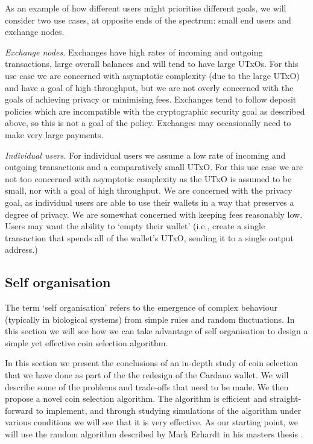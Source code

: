 \documentclass{article}
\theoremstyle{definition}{
  \newtheorem{lemma}{Lemma}[section] %
  \newtheorem{definition}[lemma]{Definition}
}
\theoremstyle{theorem}{
  \newtheorem{invariant}[lemma]{Invariant}
  \newtheorem{proofobligation}[lemma]{Proof Obligation}
}
\numberwithin{equation}{lemma}
\begin{document}
As an example of how different users might prioritise different goals,
we will consider two use cases, at opposite ends of the spectrum: small end
users and exchange nodes.

\emph{Exchange nodes.}
Exchanges have high rates of incoming and outgoing transactions, large overall
balances and will tend to have large UTxOs. For this use case we are concerned
with asymptotic complexity (due to the large UTxO) and have a goal of high
throughput, but we are not overly concerned with the goals of achieving privacy
or minimising fees. Exchanges tend to follow deposit policies which are
incompatible with the cryptographic security goal as described above, so this is
not a goal of the policy. Exchanges may occasionally need to make very large
payments.

\emph{Individual users.}
For individual users we assume a low rate of incoming and outgoing transactions
and a comparatively small UTxO. For this use case we are not too concerned with
asymptotic complexity as the UTxO is assumed to be small, nor with a goal of
high throughput. We are concerned with the privacy goal, as individual users
are able to use their wallets in a way that preserves a degree of privacy. We
are somewhat concerned with keeping fees reasonably low. Users may want the
ability to `empty their wallet' (i.e., create a single transaction that
spends all of the wallet's UTxO, sending it to a single output address.)

\subsection{Self organisation}
\label{sec:selforganisation}

The term `self organisation' refers to the emergence of complex behaviour
(typically in biological systems) from simple rules and random fluctuations.
In this section we will see how we can take advantage of self organisation
to design a simple yet effective coin selection algorithm.

In this section we present the conclusions of an in-depth study of coin
selection that we have done as part of the the redesign of the Cardano wallet.
We will describe some of the problems and trade-offs that need to be made. We
then propose a novel coin selection algorithm. The algorithm is efficient and
straight-forward to implement, and through studying simulations of the algorithm
under various conditions we will see that it is very effective.
As our starting point, we will use the random algorithm described by Mark
Erhardt in his masters thesis \citep{Erhardt:thesis}.
\end{document}
